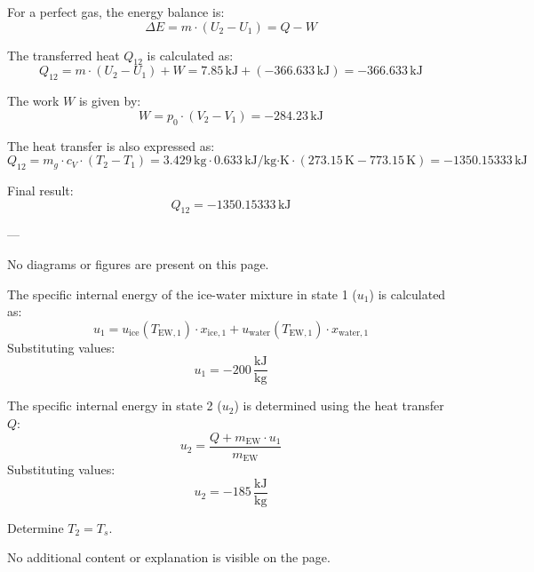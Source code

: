 For a perfect gas, the energy balance is:  
\[
\Delta E = m \cdot (U_2 - U_1) = Q - W
\]  

The transferred heat \( Q_{12} \) is calculated as:  
\[
Q_{12} = m \cdot (U_2 - U_1) + W = 7.85 \, \text{kJ} + (-366.633 \, \text{kJ}) = -366.633 \, \text{kJ}
\]  

The work \( W \) is given by:  
\[
W = p_0 \cdot (V_2 - V_1) = -284.23 \, \text{kJ}
\]  

The heat transfer is also expressed as:  
\[
Q_{12} = m_g \cdot c_V \cdot (T_2 - T_1) = 3.429 \, \text{kg} \cdot 0.633 \, \text{kJ/kg·K} \cdot (273.15 \, \text{K} - 773.15 \, \text{K}) = -1350.15333 \, \text{kJ}
\]  

Final result:  
\[
Q_{12} = -1350.15333 \, \text{kJ}
\]  

---

No diagrams or figures are present on this page.

The specific internal energy of the ice-water mixture in state 1 (\( u_1 \)) is calculated as:  
\[
u_1 = u_{\text{ice}}(T_{\text{EW},1}) \cdot x_{\text{ice},1} + u_{\text{water}}(T_{\text{EW},1}) \cdot x_{\text{water},1}
\]  
Substituting values:  
\[
u_1 = -200 \, \frac{\text{kJ}}{\text{kg}}
\]  

The specific internal energy in state 2 (\( u_2 \)) is determined using the heat transfer \( Q \):  
\[
u_2 = \frac{Q + m_{\text{EW}} \cdot u_1}{m_{\text{EW}}}
\]  
Substituting values:  
\[
u_2 = -185 \, \frac{\text{kJ}}{\text{kg}}
\]

Determine \( T_2 = T_s \).  

No additional content or explanation is visible on the page.